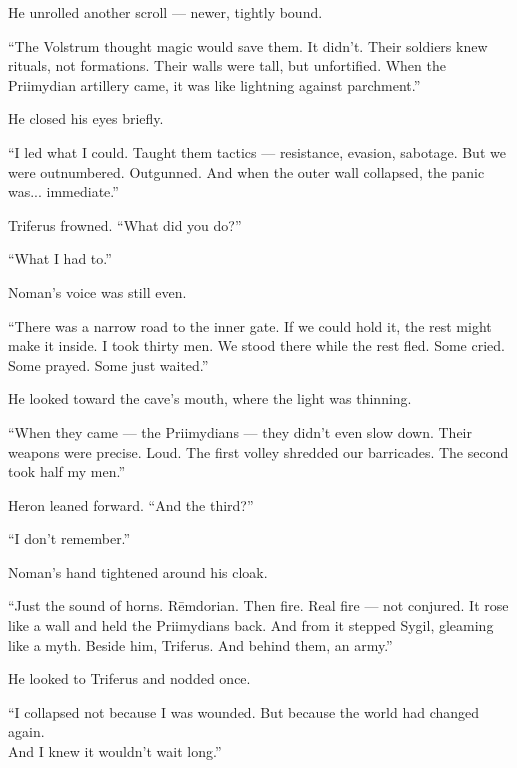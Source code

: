 \documentclass[12pt]{article}
\begin{document}
\vspace{1em}

He unrolled another scroll — newer, tightly bound.

“The Volstrum thought magic would save them. It didn’t. Their soldiers knew rituals, not formations. Their walls were tall, but unfortified. When the Priimydian artillery came, it was like lightning against parchment.”

He closed his eyes briefly.

“I led what I could. Taught them tactics — resistance, evasion, sabotage. But we were outnumbered. Outgunned. And when the outer wall collapsed, the panic was... immediate.”

\vspace{1em}

Triferus frowned. “What did you do?”

“What I had to.”

Noman’s voice was still even.

“There was a narrow road to the inner gate. If we could hold it, the rest might make it inside. I took thirty men. We stood there while the rest fled. Some cried. Some prayed. Some just waited.”

He looked toward the cave’s mouth, where the light was thinning.

“When they came — the Priimydians — they didn’t even slow down. Their weapons were precise. Loud. The first volley shredded our barricades. The second took half my men.”

\vspace{1em}

Heron leaned forward. “And the third?”

“I don’t remember.”

Noman’s hand tightened around his cloak.

“Just the sound of horns. Rēmdorian. Then fire. Real fire — not conjured. It rose like a wall and held the Priimydians back. And from it stepped Sygil, gleaming like a myth. Beside him, Triferus. And behind them, an army.”

He looked to Triferus and nodded once.

\vspace{1em}

“I collapsed not because I was wounded. But because the world had changed again.\\
And I knew it wouldn’t wait long.”

\vspace{1em}
\end{document}
